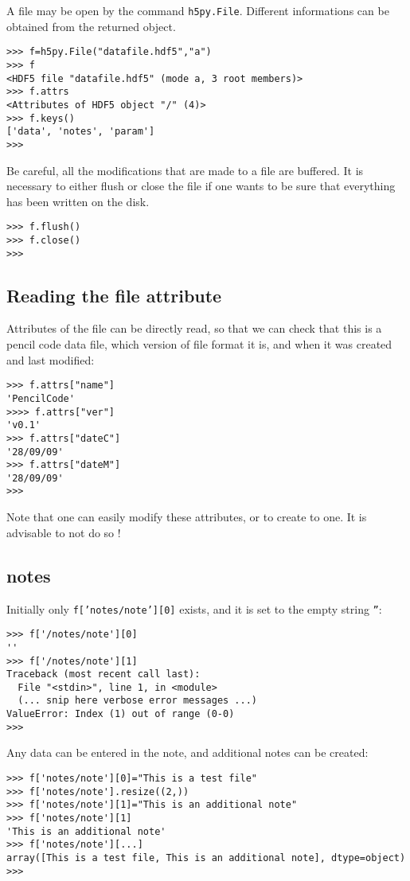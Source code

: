 \documentclass[a4paper,12pt]{article}
\begin{document}
A file may be open by the command \texttt{h5py.File}. Different
informations can be obtained from the returned object.
\begin{verbatim}
>>> f=h5py.File("datafile.hdf5","a")
>>> f
<HDF5 file "datafile.hdf5" (mode a, 3 root members)>
>>> f.attrs
<Attributes of HDF5 object "/" (4)>
>>> f.keys()
['data', 'notes', 'param']
>>>
\end{verbatim}

Be careful, all the modifications that are made to a file are
buffered. It is necessary to either flush or close the file if one
wants to be sure that everything has been written on the disk.
\begin{verbatim}
>>> f.flush()
>>> f.close()
>>>
\end{verbatim}

\subsection{Reading the file attribute}
\label{sec:read-file-attr}

Attributes of the file can be directly read, so that we can check that
this is a pencil code data file, which version of file format it is,
and when it was created and last modified:
\begin{verbatim}
>>> f.attrs["name"]
'PencilCode'
>>>> f.attrs["ver"]
'v0.1'
>>> f.attrs["dateC"]
'28/09/09'
>>> f.attrs["dateM"]
'28/09/09'
>>>
\end{verbatim}
Note that one can easily modify these attributes, or to create to
one. It is advisable to not do so !

\subsection{notes}
\label{sec:notes}

Initially only \texttt{f['notes/note'][0]} exists, and it is
set to the empty string \texttt{''}:
\begin{verbatim}
>>> f['/notes/note'][0]
''
>>> f['/notes/note'][1]
Traceback (most recent call last):
  File "<stdin>", line 1, in <module>
  (... snip here verbose error messages ...)
ValueError: Index (1) out of range (0-0)
>>>
\end{verbatim}

Any data can be entered in the note, and additional notes can be created:
\begin{verbatim}
>>> f['notes/note'][0]="This is a test file"
>>> f['notes/note'].resize((2,))
>>> f['notes/note'][1]="This is an additional note"
>>> f['notes/note'][1]
'This is an additional note'
>>> f['notes/note'][...]
array([This is a test file, This is an additional note], dtype=object)
>>> 
\end{verbatim}
\end{document}
